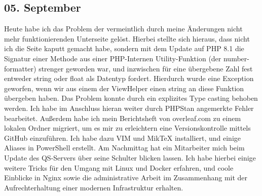 \subsection{05. September}
Heute habe ich das Problem der vermeintlich durch meine Änderungen nicht mehr funktionierenden Unterseite gelöst. Hierbei stellte sich hieraus, dass nicht ich die Seite kaputt gemacht habe, sondern mit dem Update auf PHP 8.1 die Signatur einer Methode aus einer PHP-Internen Utility-Funktion (der number-formatter) strenger geworden war, und inzwischen für eine übergebene Zahl fest entweder string oder float als Datentyp fordert. Hierdurch wurde eine Exception geworfen, wenn wir aus einem der ViewHelper einen string an diese Funktion übergeben haben. Das Problem konnte durch ein explizites Type casting behoben werden. Ich habe im Anschluss hieran weiter durch PHPStan angemerkte Fehler bearbeitet. Außerdem habe ich mein Berichtsheft von overleaf.com zu einem lokalen Ordner migriert, um es mir zu erleichtern eine Versionskontrolle mittels GitHub einzuführen. Ich habe dazu VIM und MikTeX installiert, und einige Aliases in PowerShell erstellt. Am Nachmittag hat ein Mitarbeiter mich beim Update des QS-Servers über seine Schulter blicken lassen. Ich habe hierbei einige weitere Tricks für den Umgang mit Linux und Docker erfahren, und coole Einblicke in Nginx sowie die administrative Arbeit im Zusammenhang mit der Aufrechterhaltung einer modernen Infrastruktur erhalten.

